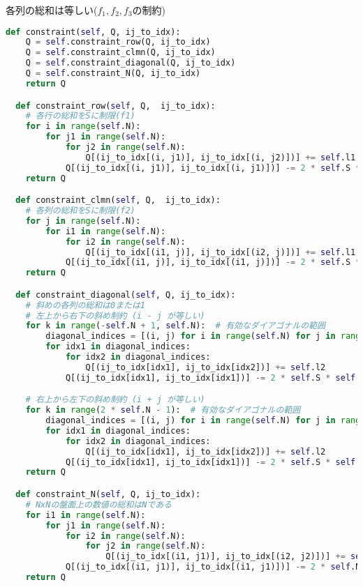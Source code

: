 \documentclass[uplatex,dvipdfmx,a4paper,11pt,oneside,openany]{jsbook}
\begin{document}
各列の総和は等しい($f_1, f_2, f_3$の制約)

\begin{lstlisting}[language=Python]
  def constraint(self, Q, ij_to_idx):
    Q = self.constraint_row(Q, ij_to_idx)
    Q = self.constraint_clmn(Q, ij_to_idx)
    Q = self.constraint_diagonal(Q, ij_to_idx)
    Q = self.constraint_N(Q, ij_to_idx)
    return Q

  def constraint_row(self, Q,  ij_to_idx):
    # 各行の総和をSに制限(f1)
    for i in range(self.N):
        for j1 in range(self.N):
            for j2 in range(self.N):
                Q[(ij_to_idx[(i, j1)], ij_to_idx[(i, j2)])] += self.l1
            Q[(ij_to_idx[(i, j1)], ij_to_idx[(i, j1)])] -= 2 * self.S * self.l1
    return Q

  def constraint_clmn(self, Q,  ij_to_idx):
    # 各列の総和をSに制限(f2)
    for j in range(self.N):
        for i1 in range(self.N):
            for i2 in range(self.N):
                Q[(ij_to_idx[(i1, j)], ij_to_idx[(i2, j)])] += self.l1
            Q[(ij_to_idx[(i1, j)], ij_to_idx[(i1, j)])] -= 2 * self.S * self.l1
    return Q

  def constraint_diagonal(self, Q, ij_to_idx):
    # 斜めの各列の総和は0または1
    # 左上から右下の斜め制約 (i - j が等しい)
    for k in range(-self.N + 1, self.N):  # 有効なダイアゴナルの範囲
        diagonal_indices = [(i, j) for i in range(self.N) for j in range(self.N) if i - j == k]
        for idx1 in diagonal_indices:
            for idx2 in diagonal_indices:
                Q[(ij_to_idx[idx1], ij_to_idx[idx2])] += self.l2
            Q[(ij_to_idx[idx1], ij_to_idx[idx1])] -= 2 * self.S * self.l2

    # 右上から左下の斜め制約 (i + j が等しい)
    for k in range(2 * self.N - 1):  # 有効なダイアゴナルの範囲
        diagonal_indices = [(i, j) for i in range(self.N) for j in range(self.N) if i + j == k]
        for idx1 in diagonal_indices:
            for idx2 in diagonal_indices:
                Q[(ij_to_idx[idx1], ij_to_idx[idx2])] += self.l2
            Q[(ij_to_idx[idx1], ij_to_idx[idx1])] -= 2 * self.S * self.l2
    return Q

  def constraint_N(self, Q, ij_to_idx):
    # NxNの盤面上の数値の総和はNである
    for i1 in range(self.N):
        for j1 in range(self.N):
            for i2 in range(self.N):
                for j2 in range(self.N):
                    Q[(ij_to_idx[(i1, j1)], ij_to_idx[(i2, j2)])] += self.l3
            Q[(ij_to_idx[(i1, j1)], ij_to_idx[(i1, j1)])] -= 2 * self.N * self.l3
    return Q

\end{lstlisting}
\end{document}
